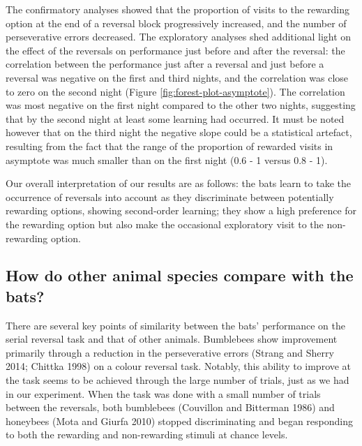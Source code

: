 \documentclass[
]{article}
\begin{document}
The confirmatory analyses showed that the proportion of visits to the rewarding option at the end of a reversal block progressively increased, and the number of perseverative errors decreased. The exploratory analyses shed additional light on the effect of the reversals on performance just before and after the reversal: the correlation between the performance just after a reversal and just before a reversal was negative on the first and third nights, and the correlation was close to zero on the second night (Figure \ref{fig:forest-plot-asymptote}). The correlation was most negative on the first night compared to the other two nights, suggesting that by the second night at least some learning had occurred. It must be noted however that on the third night the negative slope could be a statistical artefact, resulting from the fact that the range of the proportion of rewarded visits in asymptote was much smaller than on the first night (0.6 - 1 versus 0.8 - 1).

Our overall interpretation of our results are as follows: the bats learn to take the occurrence of reversals into account as they discriminate between potentially rewarding options, showing second-order learning; they show a high preference for the rewarding option but also make the occasional exploratory visit to the non-rewarding option.

\hypertarget{how-do-other-animal-species-compare-with-the-bats}{%
\subsection{How do other animal species compare with the bats?}\label{how-do-other-animal-species-compare-with-the-bats}}

There are several key points of similarity between the bats' performance on the serial reversal task and that of other animals. Bumblebees show improvement primarily through a reduction in the perseverative errors (Strang and Sherry 2014; Chittka 1998) on a colour reversal task. Notably, this ability to improve at the task seems to be achieved through the large number of trials, just as we had in our experiment. When the task was done with a small number of trials between the reversals, both bumblebees (Couvillon and Bitterman 1986) and honeybees (Mota and Giurfa 2010) stopped discriminating and began responding to both the rewarding and non-rewarding stimuli at chance levels.
\end{document}

